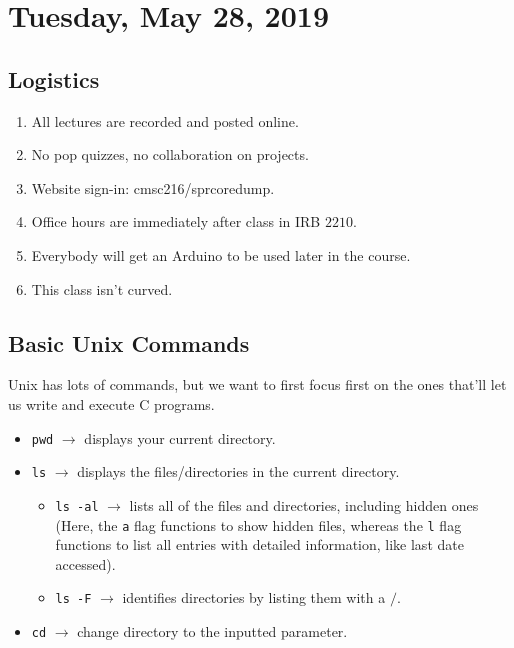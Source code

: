 \section{Tuesday, May 28, 2019}
\subsection{Logistics}
\begin{enumerate}
\item All lectures are recorded and posted online.
\item No pop quizzes, no collaboration on projects.
\item Website sign-in: cmsc216/sprcoredump.
\item Office hours are immediately after class in IRB $2210$.
\item Everybody will get an Arduino to be used later in the course. 
\item This class isn't curved.
\end{enumerate}

\newcommand{\ra}{\rightarrow}
\subsection{Basic Unix Commands}
Unix has lots of commands, but we want to first focus first on the ones that'll let us write and execute C programs. 
\begin{itemize}
    \item \verb!pwd! $\ra$  displays your current directory.
    \item \verb!ls! $\ra$ displays the files/directories in the current directory.
    \begin{itemize}
        \item \verb!ls -al! $\ra$ lists all of the files and directories, including hidden ones (Here, the \verb!a! flag functions to show hidden files, whereas the \verb!l! flag functions to list all entries with detailed information, like last date accessed). 
        \item \verb!ls -F! $\ra$ identifies directories by listing them with a $/$.
    \end{itemize}
    \item \verb!cd! $\ra$ change directory to the inputted parameter.
\end{itemize}



